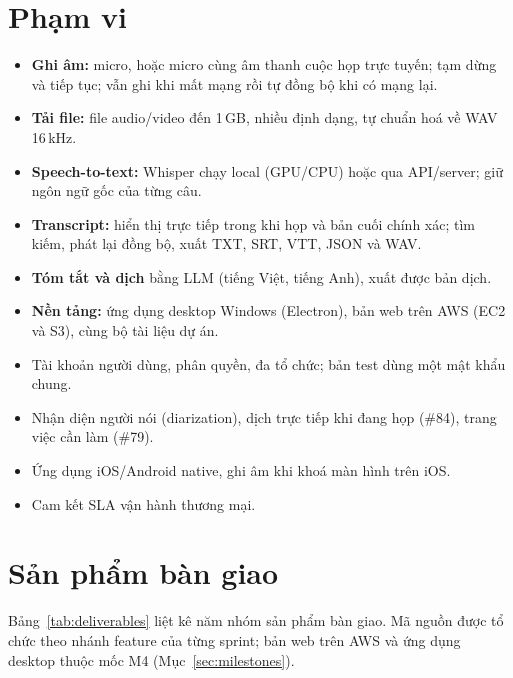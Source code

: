 \documentclass[12pt,a4paper]{report}
\begin{document}
\section{Phạm vi}
\label{sec:scope}

\begin{itemize}
  \item \textbf{Ghi âm:} micro, hoặc micro cùng âm thanh cuộc họp trực tuyến; tạm dừng và tiếp tục; vẫn ghi khi
        mất mạng rồi tự đồng bộ khi có mạng lại.
  \item \textbf{Tải file:} file audio/video đến 1\,GB, nhiều định dạng, tự chuẩn hoá về WAV 16\,kHz.
  \item \textbf{Speech-to-text:} Whisper chạy local (GPU/CPU) hoặc qua API/server; giữ ngôn ngữ gốc của từng câu.
  \item \textbf{Transcript:} hiển thị trực tiếp trong khi họp và bản cuối chính xác; tìm kiếm, phát lại đồng bộ,
        xuất TXT, SRT, VTT, JSON và WAV.
  \item \textbf{Tóm tắt và dịch} bằng LLM (tiếng Việt, tiếng Anh), xuất được bản dịch.
  \item \textbf{Nền tảng:} ứng dụng desktop Windows (Electron), bản web trên AWS (EC2 và S3), cùng bộ tài liệu dự án.
\end{itemize}

\begin{itemize}
  \item Tài khoản người dùng, phân quyền, đa tổ chức; bản test dùng một mật khẩu chung.
  \item Nhận diện người nói (diarization), dịch trực tiếp khi đang họp (\#84), trang việc cần làm (\#79).
  \item Ứng dụng iOS/Android native, ghi âm khi khoá màn hình trên iOS.
  \item Cam kết SLA vận hành thương mại.
\end{itemize}

\section{Sản phẩm bàn giao}

Bảng~\ref{tab:deliverables} liệt kê năm nhóm sản phẩm bàn giao. Mã nguồn được tổ chức theo nhánh feature của
từng sprint; bản web trên AWS và ứng dụng desktop thuộc mốc M4 (Mục~\ref{sec:milestones}).
\end{document}

